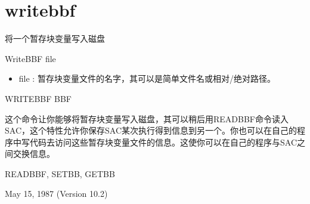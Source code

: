 \section{writebbf}
\label{cmd:writebbf}

将一个暂存块变量写入磁盘

WriteBBF {file}

\begin{itemize}
\item file : 暂存块变量文件的名字，其可以是简单文件名或相对/绝对路径。
\end{itemize}

WRITEBBF BBF

这个命令让你能够将暂存块变量写入磁盘，其可以稍后用READBBF命令读入SAC，这个特性允许你保存SAC某次执行得到信息到另一个。你也可以在自己的程序中写代码去访问这些暂存块变量文件的信息。这使你可以在自己的程序与SAC之间交换信息。

READBBF, SETBB, GETBB

May 15, 1987 (Version 10.2)

